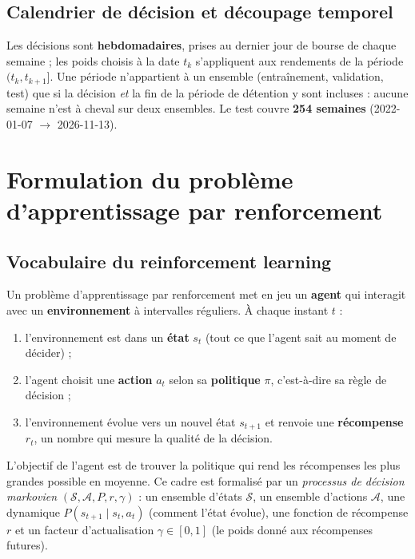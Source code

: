 \documentclass[11pt,a4paper]{article}
\begin{document}
\subsection{Calendrier de décision et découpage temporel}
Les décisions sont \textbf{hebdomadaires}, prises au dernier jour de bourse de chaque semaine ; les poids
choisis à la date \(t_k\) s'appliquent aux rendements de la période \((t_k,t_{k+1}]\). Une période n'appartient
à un ensemble (entraînement, validation, test) que si la décision \emph{et} la fin de la période de détention y
sont incluses : aucune semaine n'est à cheval sur deux ensembles. Le test couvre \textbf{254 semaines}
(2022-01-07 \(\to\) 2026-11-13).

\section{Formulation du problème d'apprentissage par renforcement}\label{sec:formulation}

\subsection{Vocabulaire du reinforcement learning}
Un problème d'apprentissage par renforcement met en jeu un \textbf{agent} qui interagit avec un
\textbf{environnement} à intervalles réguliers. À chaque instant \(t\) :
\begin{enumerate}
  \item l'environnement est dans un \textbf{état} \(s_t\) (tout ce que l'agent sait au moment de décider) ;
  \item l'agent choisit une \textbf{action} \(a_t\) selon sa \textbf{politique} \(\pi\), c'est-à-dire sa règle
        de décision ;
  \item l'environnement évolue vers un nouvel état \(s_{t+1}\) et renvoie une \textbf{récompense} \(r_t\),
        un nombre qui mesure la qualité de la décision.
\end{enumerate}
L'objectif de l'agent est de trouver la politique qui rend les récompenses les plus grandes possible en
moyenne. Ce cadre est formalisé par un \emph{processus de décision markovien}
\((\mathcal S,\mathcal A,P,r,\gamma)\) : un ensemble d'états \(\mathcal S\), un ensemble d'actions
\(\mathcal A\), une dynamique \(P(s_{t+1}\mid s_t,a_t)\) (comment l'état évolue), une fonction de récompense
\(r\) et un facteur d'actualisation \(\gamma\in[0,1]\) (le poids donné aux récompenses futures).
\end{document}
